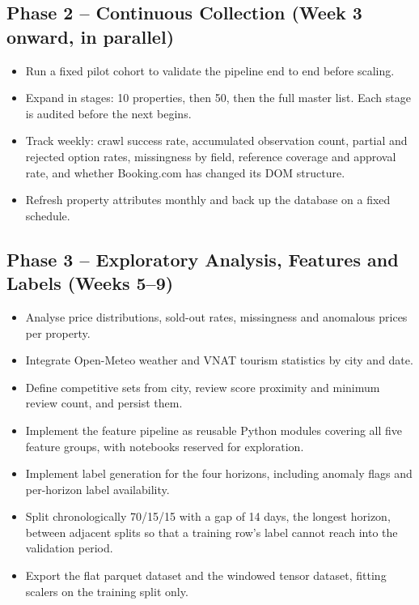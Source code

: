 \subsection{Phase 2 -- Continuous Collection (Week 3 onward, in parallel)}

\begin{itemize}[leftmargin=*]
    \item Run a fixed pilot cohort to validate the pipeline end to end before scaling.
    \item Expand in stages: 10 properties, then 50, then the full master list. Each stage is audited before the next begins.
    \item Track weekly: crawl success rate, accumulated observation count, partial and rejected option rates, missingness by field, reference coverage and approval rate, and whether Booking.com has changed its DOM structure.
    \item Refresh property attributes monthly and back up the database on a fixed schedule.
\end{itemize}

\subsection{Phase 3 -- Exploratory Analysis, Features and Labels (Weeks 5--9)}

\begin{itemize}[leftmargin=*]
    \item Analyse price distributions, sold-out rates, missingness and anomalous prices per property.
    \item Integrate Open-Meteo weather and VNAT tourism statistics by city and date.
    \item Define competitive sets from city, review score proximity and minimum review count, and persist them.
    \item Implement the feature pipeline as reusable Python modules covering all five feature groups, with notebooks reserved for exploration.
    \item Implement label generation for the four horizons, including anomaly flags and per-horizon label availability.
    \item Split chronologically 70/15/15 with a gap of 14 days, the longest horizon, between adjacent splits so that a training row's label cannot reach into the validation period.
    \item Export the flat parquet dataset and the windowed tensor dataset, fitting scalers on the training split only.
\end{itemize}


